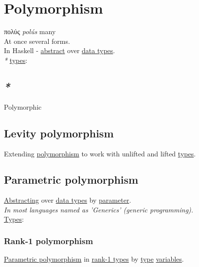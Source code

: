 \documentclass[a4paper,14pt,oneside]{book}
\begin{document}
\chapter{\label{org7392ac7}Polymorphism}
\label{sec:orgada4f93}
πολύς \emph{polús} many\\

At once several forms.\\

In Haskell - \hyperref[org9c8391a]{abstract} over \hyperref[org6e40766]{data types}.\\

\emph{*} \hyperref[org560d3e8]{types}:\\

\section{\emph{*}}
\label{sec:orgd1cab3c}

\label{orgd6cf35f}Polymorphic\\

\section{\label{orgd26d2bd}Levity polymorphism}
\label{sec:org3c651e9}
Extending \hyperref[org7392ac7]{polymorphism} to work with unlifted and lifted \hyperref[org560d3e8]{types}.\\

\section{\label{orgdca42cf}Parametric polymorphism}
\label{sec:org6f688ec}
\hyperref[orgc7b0daa]{Abstracting} over \hyperref[org6e40766]{data types} by \hyperref[org63b5bc7]{parameter}.\\

\emph{In most languages named as 'Generics' (generic programming).}\\

\hyperref[org560d3e8]{Types}:\\

\subsection{\label{orgd575484}Rank-1 polymorphism}
\label{sec:org59b22f7}
\hyperref[orgdca42cf]{Parametric polymorphism} in \hyperref[org455884b]{rank-1 types} by \hyperref[orgc4a7610]{type} \hyperref[org329012b]{variables}.\\
\end{document}
